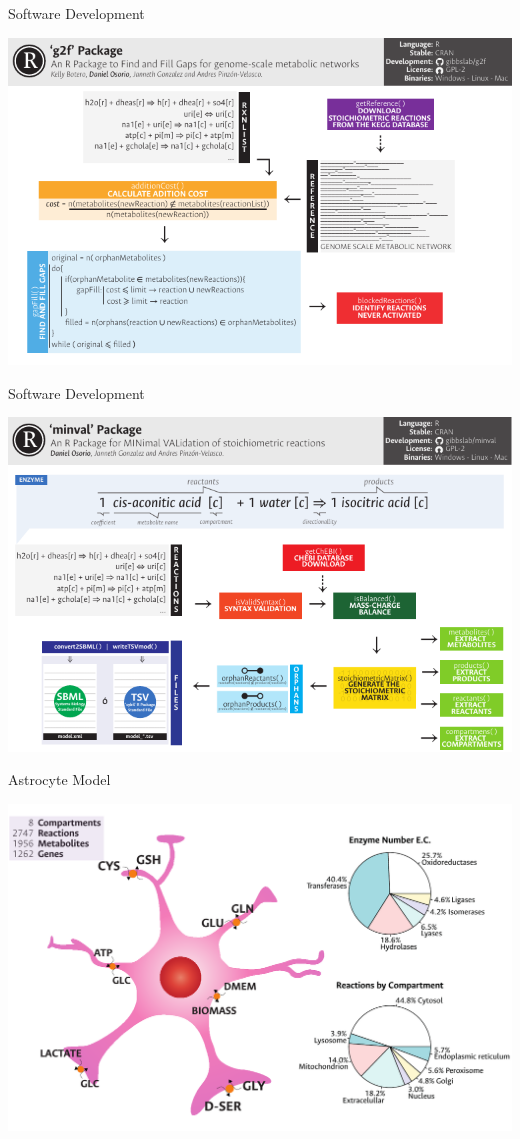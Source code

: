 \documentclass[11pt]{beamer}
\begin{document}
\begin{frame}{Software Development}
\begin{center}
\includegraphics[width=\textwidth]{g2f}
\end{center}
\end{frame}
\begin{frame}{Software Development}
\begin{center}
\includegraphics[width=\textwidth]{minval}
\end{center}
\end{frame}
\begin{frame}{Astrocyte Model}
\begin{center}
\includegraphics[width=\textwidth]{Astrocyte}
\end{center}
\end{frame}
\end{document}
